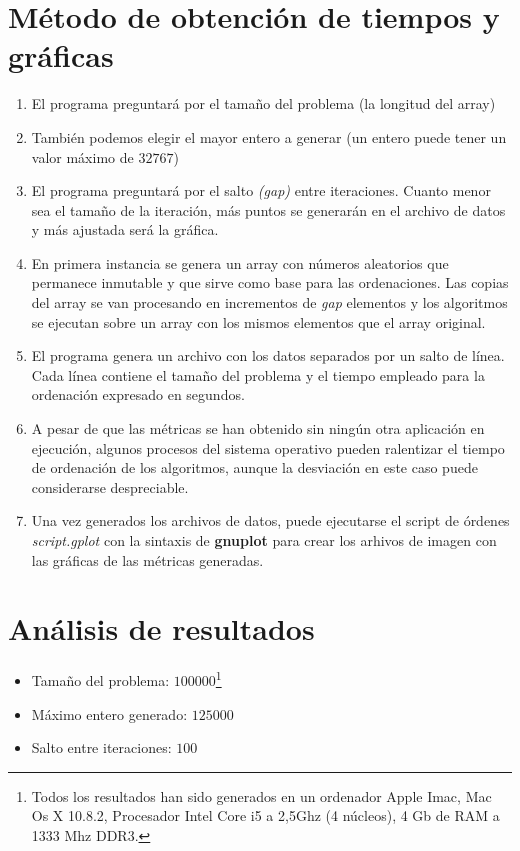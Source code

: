 \section{Método de obtención de tiempos y gráficas}
	\begin{enumerate}
		\item El programa preguntará por el tamaño del problema (la longitud del array)
		\item También podemos elegir el mayor entero a generar (un entero puede tener un valor 				máximo de $32767$)
		\item El programa preguntará por el salto \emph{(gap)} entre iteraciones.  Cuanto menor sea el tamaño de la iteración, más puntos se generarán en el archivo de datos y más ajustada será la gráfica.
		\item En primera instancia se genera un array con números aleatorios que permanece inmutable y que sirve como base 					para las ordenaciones. Las copias del array se van procesando en incrementos de \textit{gap} elementos y los algoritmos se ejecutan sobre un array con los mismos elementos que el array original.
		\item El programa genera un archivo con los datos separados por un salto de línea.  Cada 					línea contiene el tamaño del problema y el tiempo empleado para la ordenación expresado 			en segundos.
		\item A pesar de que las métricas se han obtenido sin ningún otra aplicación en ejecución, algunos procesos del sistema operativo pueden ralentizar el tiempo de ordenación de los algoritmos, aunque la desviación en este caso puede considerarse despreciable.
		\item Una vez generados los archivos de datos, puede ejecutarse el script de órdenes \textit{script.gplot} con la sintaxis de 				\textbf{gnuplot} para crear los arhivos de imagen con las gráficas de las métricas 					generadas.
	\end{enumerate}


\section{Análisis de resultados}
\begin{itemize}
\item Tamaño del problema: $100000$\footnote{Todos los resultados han sido generados en un ordenador Apple Imac, Mac Os X 10.8.2, Procesador Intel Core i5 a 2,5Ghz (4 núcleos), 4 Gb de RAM a 1333 Mhz DDR3.}
\item Máximo entero generado: $125000$
\item Salto entre iteraciones: $100$
\end{itemize}
\newpage
